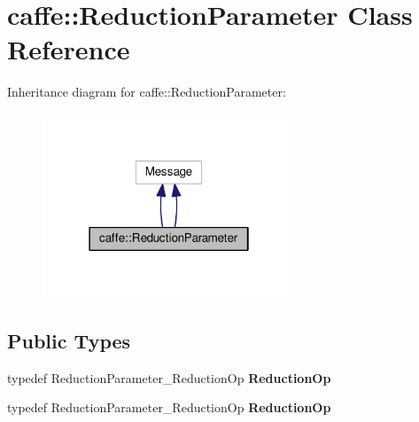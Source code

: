 \hypertarget{classcaffe_1_1_reduction_parameter}{}\section{caffe\+:\+:Reduction\+Parameter Class Reference}
\label{classcaffe_1_1_reduction_parameter}


Inheritance diagram for caffe\+:\+:Reduction\+Parameter\+:
\nopagebreak
\begin{figure}[H]
\begin{center}
\leavevmode
\includegraphics[width=214pt]{classcaffe_1_1_reduction_parameter__inherit__graph}
\end{center}
\end{figure}
\subsection*{Public Types}
\begin{DoxyCompactItemize}
\item 
\mbox{\label{classcaffe_1_1_reduction_parameter_abbb73bc88c08c4f863cd3b4d8f4cd81b}} 
typedef Reduction\+Parameter\+\_\+\+Reduction\+Op {\bfseries Reduction\+Op}
\item 
\mbox{\label{classcaffe_1_1_reduction_parameter_abbb73bc88c08c4f863cd3b4d8f4cd81b}} 
typedef Reduction\+Parameter\+\_\+\+Reduction\+Op {\bfseries Reduction\+Op}
\end{DoxyCompactItemize}
